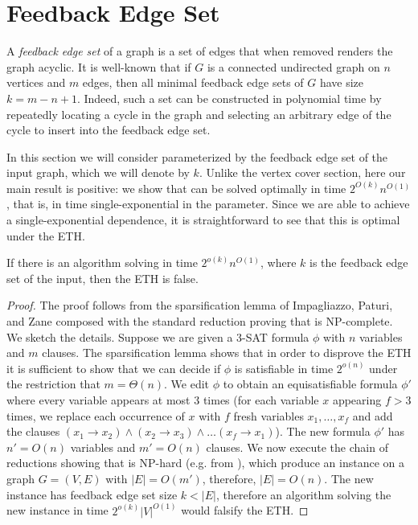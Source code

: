 \section{Feedback Edge Set}

A \emph{feedback edge set} of a graph is a set of edges that when
removed renders the graph acyclic. It is well-known that if $G$ is a connected
undirected graph on $n$ vertices and $m$ edges, then all minimal feedback edge
sets of $G$ have size $k=m-n+1$. Indeed, such a set can be constructed in
polynomial time by repeatedly locating a cycle in the graph and selecting an
arbitrary edge of the cycle to insert into the feedback edge set.


In this section we will consider \SF parameterized by the feedback edge set of
the input graph, which we will denote by $k$. Unlike the vertex cover section,
here our main result is positive: we show that \SF can be solved optimally in
time $2^{O(k)}n^{O(1)}$, that is, in time single-exponential in the parameter.
Since we are able to achieve a single-exponential dependence, it is
straightforward to see that this is optimal under the ETH.

\begin{theorem}\label{thm:feseth} %
If there is an algorithm solving \ST in time
$2^{o(k)}n^{O(1)}$, where $k$ is the feedback edge set of the input, then the
ETH is false. \end{theorem}

%

\begin{proof}%
The proof follows from the sparsification lemma of Impagliazzo,
Paturi, and Zane \cite{ImpagliazzoPZ01} composed with the standard reduction
proving that \ST is NP-complete. We sketch the details. Suppose we are given a
\textsc{3-SAT} formula $\phi$ with $n$ variables and $m$ clauses. The
sparsification lemma shows that in order to disprove the ETH it is sufficient
to show that we can decide if $\phi$ is satisfiable in time $2^{o(n)}$ under
the restriction that $m=\Theta(n)$. We edit $\phi$ to obtain an equisatisfiable
formula $\phi'$ where every variable appears at most $3$ times (for each
variable $x$ appearing $f>3$ times, we replace each occurrence of $x$ with $f$
fresh variables $x_1,\ldots, x_f$ and add the clauses $(x_1\to x_2)\land
(x_2\to x_3)\land\ldots (x_f\to x_1)$). The new formula $\phi'$ has $n'=O(n)$
variables and $m'=O(n)$ clauses. We now execute the chain of reductions showing
that \ST is NP-hard (e.g. from  \cite{karp1975computational}), which produce an
instance on a graph $G=(V,E)$ with $|E|=O(m')$, therefore, $|E|=O(n)$. The new
instance has feedback edge set size $k<|E|$, therefore an algorithm solving the
new instance in time $2^{o(k)}|V|^{O(1)}$ would falsify the ETH.  \end{proof}
    
